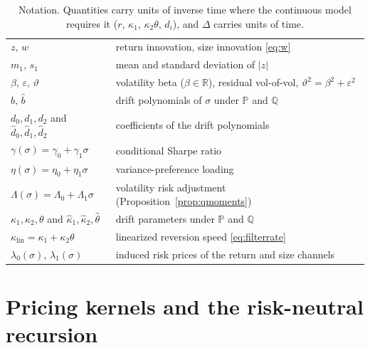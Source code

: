 \documentclass[11pt]{article}
\theoremstyle{remark}
\newcommand{\Pm}{\mathbb{P}}
\newcommand{\Qm}{\mathbb{Q}}
\newcommand{\R}{\mathbb{R}}
\newcommand{\Dt}{\Delta}
\begin{document}
\begin{table}[h]
\centering
\caption{Notation. Quantities carry units of inverse time where the
continuous model requires it ($r$, $\kappa_1$, $\kappa_2\theta$, $d_i$),
and $\Dt$ carries units of time.}
\begin{tabular}{ll}
\toprule
$z,\,w$ & return innovation, size innovation \eqref{eq:w}\\
$m_1,\,s_1$ & mean and standard deviation of $|z|$\\
$\beta,\,\varepsilon,\,\vartheta$ & volatility beta ($\beta\in\R$),
residual vol-of-vol, $\vartheta^2=\beta^2+\varepsilon^2$\\
$b,\,\hat b$ & drift polynomials of $\sigma$ under $\Pm$ and $\Qm$\\
$d_0,d_1,d_2$ and $\hat d_0,\hat d_1,\hat d_2$ & coefficients of the drift
polynomials\\
$\gamma(\sigma)=\gamma_0+\gamma_1\sigma$ & conditional Sharpe ratio\\
$\eta(\sigma)=\eta_0+\eta_1\sigma$ & variance-preference loading\\
$\Lambda(\sigma)=\Lambda_0+\Lambda_1\sigma$ & volatility risk adjustment
(Proposition~\ref{prop:qmoments})\\
$\kappa_1,\kappa_2,\theta$ and $\hat\kappa_1,\hat\kappa_2,\hat\theta$ &
drift parameters under $\Pm$ and $\Qm$\\
$\kappa_{\mathrm{lin}}=\kappa_1+\kappa_2\theta$ & linearized reversion
speed \eqref{eq:filterrate}\\
$\lambda_0(\sigma),\,\lambda_1(\sigma)$ & induced risk prices of the return
and size channels\\
\bottomrule
\end{tabular}
\end{table}

\section{Pricing kernels and the risk-neutral recursion}\label{sec:kernel}
\end{document}

